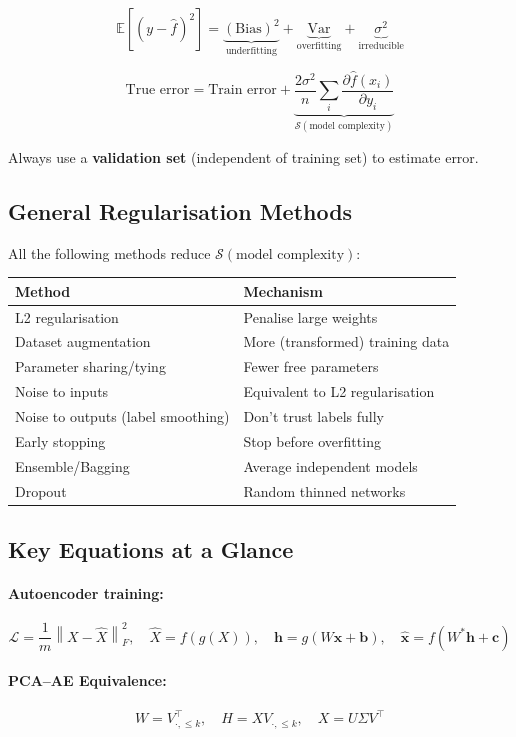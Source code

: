 \documentclass[12pt,a4paper]{article}
\newcommand{\E}{\mathbb{E}}
\newcommand{\Var}{\mathrm{Var}}
\newcommand{\Bias}{\mathrm{Bias}}
\newcommand{\norm}[1]{\left\|#1\right\|}
\newcommand{\vx}{\mathbf{x}}
\newcommand{\vh}{\mathbf{h}}
\newcommand{\vb}{\mathbf{b}}
\newcommand{\vc}{\mathbf{c}}
\newcommand{\hatx}{\hat{\mathbf{x}}}
\newcommand{\Loss}{\mathcal{L}}
\newcommand{\Reg}{\mathcal{S}}
\begin{document}
\[
  \E[(y-\hat{f})^2] = \underbrace{(\Bias)^2}_{\text{underfitting}} + \underbrace{\Var}_{\text{overfitting}} + \underbrace{\sigma^2}_{\text{irreducible}}
\]

\[
  \text{True error} = \text{Train error} + \underbrace{\frac{2\sigma^2}{n}\sum_i\frac{\partial\hat{f}(x_i)}{\partial y_i}}_{\Reg(\text{model complexity})}
\]

Always use a \textbf{validation set} (independent of training set) to estimate error.

\subsection{General Regularisation Methods}

All the following methods reduce $\Reg(\text{model complexity})$:

\begin{center}
\begin{tabular}{lp{7cm}}
\toprule
\textbf{Method} & \textbf{Mechanism} \\
\midrule
L2 regularisation & Penalise large weights \\
Dataset augmentation & More (transformed) training data \\
Parameter sharing/tying & Fewer free parameters \\
Noise to inputs & Equivalent to L2 regularisation \\
Noise to outputs (label smoothing) & Don't trust labels fully \\
Early stopping & Stop before overfitting \\
Ensemble/Bagging & Average independent models \\
Dropout & Random thinned networks \\
\bottomrule
\end{tabular}
\end{center}

\subsection{Key Equations at a Glance}

\paragraph{Autoencoder training:}
\[
  \Loss = \frac{1}{m}\norm{X - \hat{X}}_F^2,\quad
  \hat{X} = f(g(X)),\quad
  \vh = g(W\vx + \vb),\quad
  \hatx = f(W^*\vh + \vc)
\]

\paragraph{PCA--AE Equivalence:}
\[
  W = V_{\cdot,\leq k}^\top,\quad
  H = XV_{\cdot,\leq k},\quad
  X = U\Sigma V^\top
\]
\end{document}
